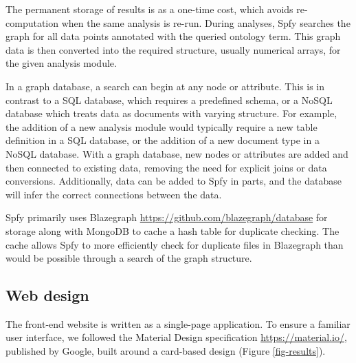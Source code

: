 \documentclass{article}
\begin{document}
The permanent storage of results is as a one-time cost, which avoids re-computation when the same analysis is re-run. During analyses, Spfy searches the graph for all data points annotated with the queried ontology term. This graph data is then converted into the required structure, usually numerical arrays, for the given analysis module.

In a graph database, a search can begin at any node or attribute. This is in contrast to a SQL database, which requires a predefined schema, or a NoSQL database which treats data as documents with varying structure.
For example, the addition of a new analysis module would typically require a new table definition in a SQL database, or the addition of a new document type in a NoSQL database. With a graph database, new nodes or attributes are added and then connected to existing data, removing the need for explicit joins or data conversions. Additionally, data can be added to Spfy in parts, and the database will infer the correct connections between the data.

Spfy primarily uses Blazegraph \url{https://github.com/blazegraph/database} for storage along with MongoDB to cache a hash table for duplicate checking.
The cache allows Spfy to more efficiently check for duplicate files in Blazegraph than would be possible through a search of the graph structure.

\subsection{Web design}

The front-end website is written as a single-page application.
To ensure a familiar user interface, we followed the Material Design specification \url{https://material.io/}, published by Google, built around a card-based design (Figure \ref{fig-results}).
\end{document}
